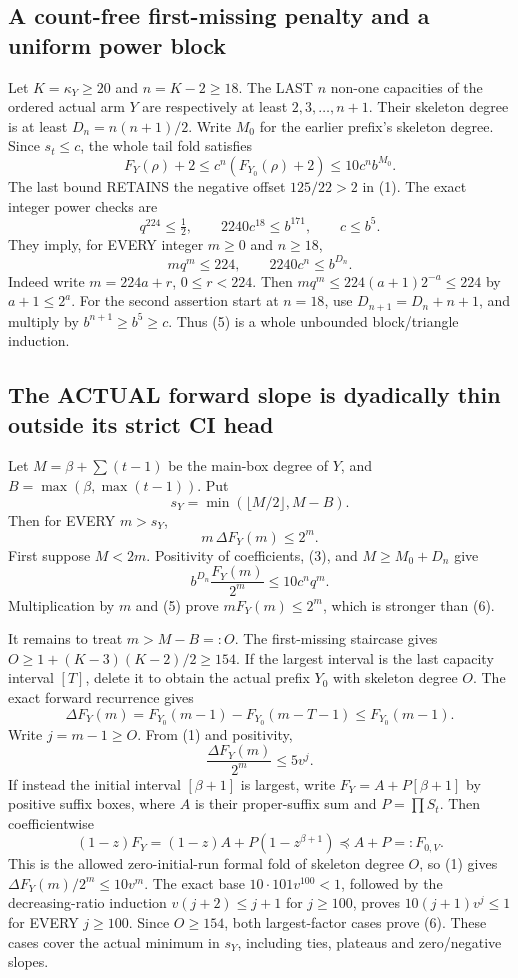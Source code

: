 \documentclass[11pt]{article}
\begin{document}
\subsection{A count-free first-missing penalty and a uniform power block}
Let $K=\kappa_Y\ge20$ and $n=K-2\ge18$. The LAST $n$ non-one
capacities of the ordered actual arm $Y$ are respectively at least
$2,3,\ldots,n+1$. Their skeleton degree is at least
$D_n=n(n+1)/2$. Write $M_0$ for the earlier prefix's skeleton degree.
Since $s_t\le c$, the whole tail fold satisfies
\[
 F_Y(\rho)+2\le c^n(F_{Y_0}(\rho)+2)
                  \le10c^n b^{M_0}.                  \tag{3}
\]
The last bound RETAINS the negative offset $125/22>2$ in (1).
The exact integer power checks are
\[
 q^{224}\le\tfrac12,\qquad
           2240c^{18}\le b^{171},\qquad c\le b^5.    \tag{4}
\]
They imply, for EVERY integer $m\ge0$ and $n\ge18$,
\[
                 m q^m\le224,\qquad2240c^n\le b^{D_n}. \tag{5}
\]
Indeed write $m=224a+r$, $0\le r<224$. Then
$m q^m\le224(a+1)2^{-a}\le224$ by $a+1\le2^a$.
For the second assertion start at $n=18$, use
$D_{n+1}=D_n+n+1$, and multiply by $b^{n+1}\ge b^5\ge c$.
Thus (5) is a whole unbounded block/triangle induction.

\subsection{The ACTUAL forward slope is dyadically thin outside its strict CI head}
Let $M=\beta+\sum(t-1)$ be the main-box degree of $Y$, and
$B=\max(\beta,\max(t-1))$. Put
\[
                            s_Y=\min(\lfloor M/2\rfloor,M-B).
\]
Then for EVERY $m>s_Y$,
\[
                          m\,\Delta F_Y(m)\le2^m.    \tag{6}
\]
First suppose $M<2m$. Positivity of coefficients, (3), and
$M\ge M_0+D_n$ give
\[
 b^{D_n}\frac{F_Y(m)}{2^m}
        \le10c^n q^m.
\]
Multiplication by $m$ and (5) prove $mF_Y(m)\le2^m$,
which is stronger than (6).

It remains to treat $m>M-B=:O$. The first-missing staircase gives
$O\ge1+(K-3)(K-2)/2\ge154$.
If the largest interval is the last capacity interval $[T]$, delete it
to obtain the actual prefix $Y_0$ with skeleton degree $O$. The exact
forward recurrence gives
\[
 \Delta F_Y(m)=F_{Y_0}(m-1)-F_{Y_0}(m-T-1)\le F_{Y_0}(m-1).
\]
Write $j=m-1\ge O$. From (1) and positivity,
\[
                   \frac{\Delta F_Y(m)}{2^m}\le5v^j.
\]
If instead the initial interval $[\beta+1]$ is largest, write
$F_Y=A+P[\beta+1]$ by positive suffix boxes, where
$A$ is their proper-suffix sum and $P=\prod S_t$.
Then coefficientwise
\[
 (1-z)F_Y=(1-z)A+P(1-z^{\beta+1})\preceq A+P=:F_{0,V}.
\]
This is the allowed zero-initial-run formal fold of skeleton degree $O$,
so (1) gives $\Delta F_Y(m)/2^m\le10v^m$.
The exact base $10\cdot101v^{100}<1$, followed by the decreasing-ratio
induction $v(j+2)\le j+1$ for $j\ge100$, proves
$10(j+1)v^j\le1$ for EVERY $j\ge100$. Since $O\ge154$,
both largest-factor cases prove (6). These cases cover the actual minimum
in $s_Y$, including ties, plateaus and zero/negative slopes.
\end{document}
